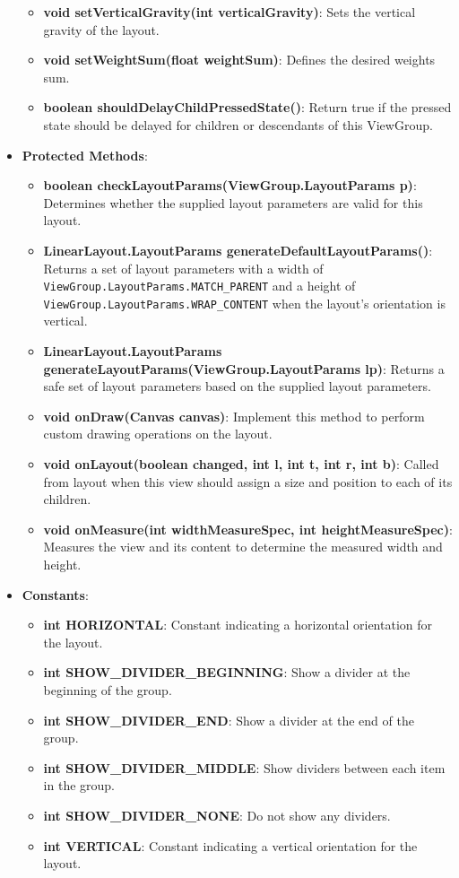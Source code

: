 \documentclass{report}
\begin{document}
\begin{itemize}
\begin{itemize}
                \item \textbf{void setVerticalGravity(int verticalGravity)}: Sets the vertical gravity of the layout.
                \item \textbf{void setWeightSum(float weightSum)}: Defines the desired weights sum.
                \item \textbf{boolean shouldDelayChildPressedState()}: Return true if the pressed state should be delayed for children or descendants of this ViewGroup.
            \end{itemize}
        \item \textbf{Protected Methods}:
            \begin{itemize}
                \item \textbf{boolean checkLayoutParams(ViewGroup.LayoutParams p)}: Determines whether the supplied layout parameters are valid for this layout.
                \item \textbf{LinearLayout.LayoutParams generateDefaultLayoutParams()}: Returns a set of layout parameters with a width of \texttt{ViewGroup.LayoutParams.MATCH\_PARENT} and a height of \texttt{ViewGroup.LayoutParams.WRAP\_CONTENT} when the layout's orientation is vertical.
                \item \textbf{LinearLayout.LayoutParams generateLayoutParams(ViewGroup.LayoutParams lp)}: Returns a safe set of layout parameters based on the supplied layout parameters.
                \item \textbf{void onDraw(Canvas canvas)}: Implement this method to perform custom drawing operations on the layout.
                \item \textbf{void onLayout(boolean changed, int l, int t, int r, int b)}: Called from layout when this view should assign a size and position to each of its children.
                \item \textbf{void onMeasure(int widthMeasureSpec, int heightMeasureSpec)}: Measures the view and its content to determine the measured width and height.
            \end{itemize}

        \item \textbf{Constants}:
            \begin{itemize}
                \item \textbf{int HORIZONTAL}: Constant indicating a horizontal orientation for the layout.
                \item \textbf{int SHOW\_DIVIDER\_BEGINNING}: Show a divider at the beginning of the group.
                \item \textbf{int SHOW\_DIVIDER\_END}: Show a divider at the end of the group.
                \item \textbf{int SHOW\_DIVIDER\_MIDDLE}: Show dividers between each item in the group.
                \item \textbf{int SHOW\_DIVIDER\_NONE}: Do not show any dividers.
                \item \textbf{int VERTICAL}: Constant indicating a vertical orientation for the layout.
            \end{itemize}



\end{itemize}
\end{document}
